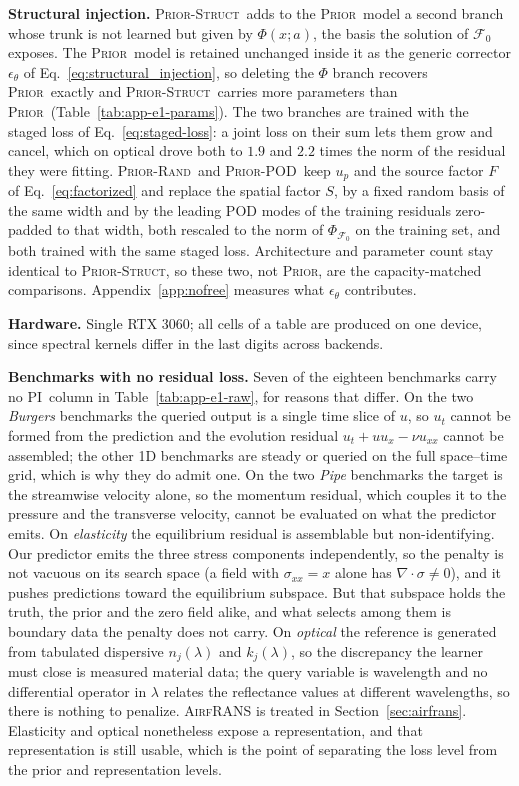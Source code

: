 \documentclass{article}
\newcommand{\armpi}{\textsc{PI}}
\newcommand{\armprior}{\textsc{Prior}}
\newcommand{\armstruct}{\textsc{Prior-Struct}}
\newcommand{\armrand}{\textsc{Prior-Rand}}
\newcommand{\armpod}{\textsc{Prior-POD}}
\begin{document}
\textbf{Structural injection.} \armstruct\ adds to the \armprior\ model a second branch whose trunk
is not learned but given by $\Phi(x;a)$, the basis the solution of $\mathcal{F}_0$ exposes. The
\armprior\ model is retained unchanged inside it as the generic corrector $\epsilon_\theta$ of
Eq.~\ref{eq:structural_injection}, so deleting the $\Phi$ branch recovers \armprior\ exactly and
\armstruct\ carries more parameters than \armprior\ (Table~\ref{tab:app-e1-params}). The two
branches are trained with the staged loss of Eq.~\ref{eq:staged-loss}: a joint loss on their sum
lets them grow and cancel, which on optical drove both to $1.9$ and $2.2$ times the norm of the
residual they were fitting. \armrand\ and \armpod\ keep $u_p$ and the source factor $F$ of
Eq.~\ref{eq:factorized} and replace the spatial factor $S$, by a fixed random basis of the same
width and by the leading POD modes of the training residuals zero-padded to that width, both
rescaled to the norm of $\Phi_{\mathcal{F}_0}$ on the training set, and both trained with the same
staged loss. Architecture and parameter count stay identical to \armstruct, so these two, not
\armprior, are the capacity-matched comparisons. Appendix~\ref{app:nofree} measures what
$\epsilon_\theta$ contributes.

\textbf{Hardware.} Single RTX 3060; all cells of a table are produced on one device, since spectral kernels differ in the last digits across backends.

\textbf{Benchmarks with no residual loss.} Seven of the eighteen benchmarks carry no
\armpi\ column in Table~\ref{tab:app-e1-raw}, for reasons that differ. On the two \emph{Burgers}
benchmarks the queried output is a single time slice of $u$, so $u_t$ cannot be formed
from the prediction and the evolution residual $u_t+uu_x-\nu u_{xx}$ cannot be
assembled; the other 1D benchmarks are steady or queried on the full space--time grid,
which is why they do admit one. On the two \emph{Pipe} benchmarks the target is the
streamwise velocity alone, so the momentum residual, which couples it to the pressure and the
transverse velocity, cannot be evaluated on what the predictor emits. On \emph{elasticity} the equilibrium residual is
assemblable but non-identifying. Our predictor emits the three stress components
independently, so the penalty is not vacuous on its search space (a field with
$\sigma_{xx}=x$ alone has $\nabla\!\cdot\!\sigma\neq0$), and it pushes predictions
toward the equilibrium subspace. But that subspace holds the truth, the prior and the
zero field alike, and what selects among them is boundary data the penalty does not
carry. On \emph{optical} the
reference is generated from tabulated dispersive $n_j(\lambda)$ and $k_j(\lambda)$, so
the discrepancy the learner must close is measured material data; the query variable
is wavelength and no differential operator in $\lambda$ relates the reflectance values
at different wavelengths, so there is nothing to penalize. \textsc{AirfRANS} is
treated in Section~\ref{sec:airfrans}. Elasticity and optical nonetheless expose a
representation, and that representation is still
usable, which is the point of separating the loss level from the prior and
representation levels.
\end{document}
